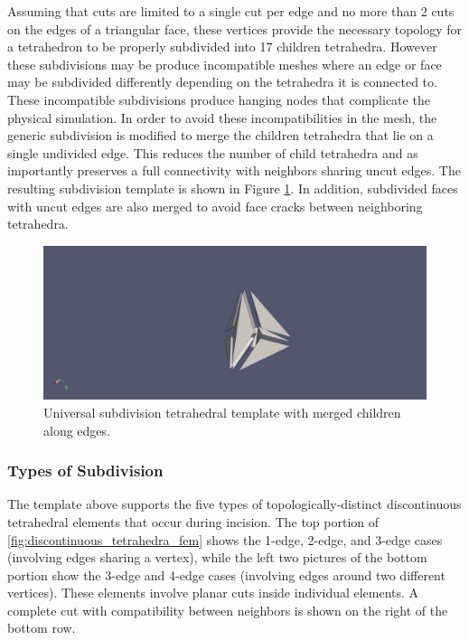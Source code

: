 Assuming that cuts are limited to a single cut per edge and no more than 2 cuts on the edges of a triangular face, 
these vertices provide the necessary topology for a tetrahedron to be properly subdivided into 17 children tetrahedra. However these subdivisions may be produce incompatible meshes where an edge or face may be subdivided differently depending on the tetrahedra it is connected to. These incompatible subdivisions produce hanging nodes that complicate the physical simulation. In order to avoid these incompatibilities in the mesh, the generic subdivision is modified to merge the children tetrahedra that lie on a single undivided edge. This reduces the number of child tetrahedra and as importantly preserves a full connectivity with neighbors sharing uncut edges. The resulting subdivision template is shown in Figure \ref{fig:Merged_universal_subdivision}. In addition, subdivided faces with uncut edges are also merged to avoid face cracks between neighboring tetrahedra. 

\begin{figure}
  \centering%
  \includegraphics[width=0.85\linewidth]{figures/cutting/Merged_universal.png}
  \caption{Universal subdivision tetrahedral template with merged children along edges.}\label{fig:Merged_universal_subdivision}
\end{figure}


\subsubsection{Types of Subdivision}

The template above supports the five types of topologically-distinct discontinuous tetrahedral elements that occur during incision. The top portion of \autoref{fig:discontinuous_tetrahedra_fem} shows the 1-edge, 2-edge, and 3-edge cases (involving edges sharing a vertex), while the left two pictures of the bottom portion show the 3-edge and 4-edge cases (involving edges around two different vertices). These elements involve planar cuts inside individual elements. A complete cut with compatibility between neighbors is shown on the right of the bottom row.

